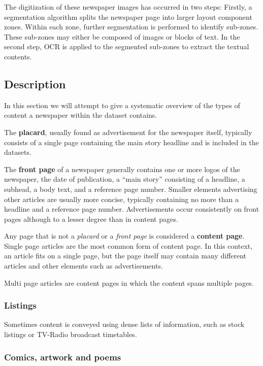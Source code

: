\documentclass[oneside, english, bibtex]{kththesis}
\begin{document}
The digitization of these newspaper images has occurred in two steps: Firstly, a segmentation algorithm splits the newspaper page into larger layout component zones. Within each zone, further segmentation is performed to identify sub-zones. These sub-zones may either be composed of images or blocks of text. In the second step, OCR is applied to the segmented sub-zones to extract the textual contents.

\subsection{Description}

In this section we will attempt to give a systematic overview of the types of content a newspaper within the dataset contains.

The \textbf{placard}, usually found as advertisement for the newspaper itself, typically consists of a single page containing the main story headline and is included in the datasets.

The \textbf{front page} of a newspaper generally contains one or more logos of the newspaper,
the date of publication, a “main story” consisting of a headline, a subhead, a body text, and a reference page number.
Smaller elements advertising other articles are usually more concise, typically containing no more than a headline and a reference page number.
Advertisements occur consistently on front pages although to a lesser degree than in content pages.

Any page that is not a \textit{placard} or a \textit{front page} is considered a \textbf{content page}. Single page articles are the most common form of content page.
In this context, an article fits on a single page, but the page itself may contain many different articles and other elements such as advertisements.

Multi page articles are content pages in which the content spans multiple pages.

\subsubsection{Listings}
\label{bgsubsec:listings}
Sometimes content is conveyed using dense lists of information, such as stock listings or TV-Radio broadcast timetables.

\subsubsection{Comics, artwork and poems}
\end{document}
